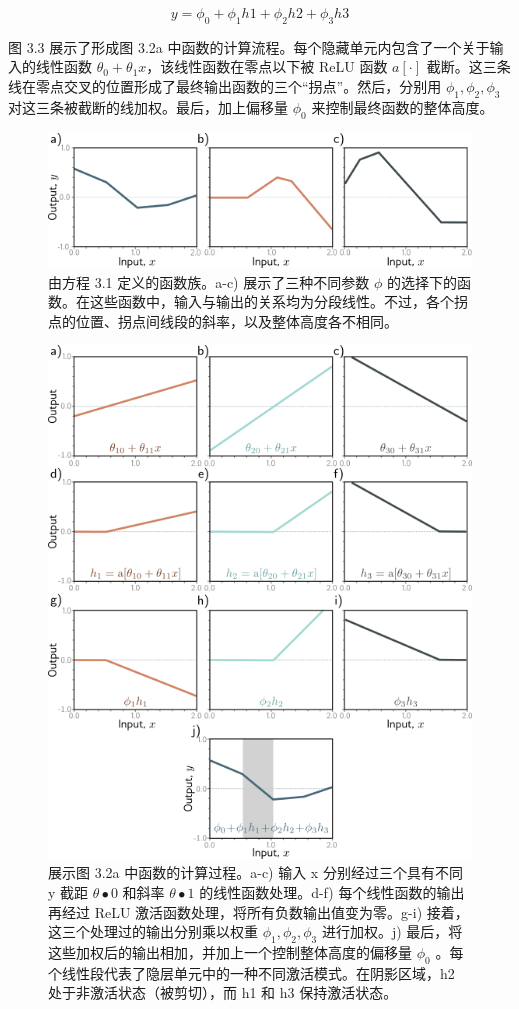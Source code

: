 \begin{equation}
y = \phi_0 + \phi_1h1 + \phi_2h2 + \phi_3h3 
\end{equation}

图 3.3 展示了形成图 3.2a 中函数的计算流程。每个隐藏单元内包含了一个关于输入的线性函数 \(\theta_0 + \theta_1x\)，该线性函数在零点以下被 ReLU 函数 \(a[\cdot]\) 截断。这三条线在零点交叉的位置形成了最终输出函数的三个“拐点”。然后，分别用 \(\phi_1, \phi_2, \phi_3\) 对这三条被截断的线加权。最后，加上偏移量 \(\phi_0\) 来控制最终函数的整体高度。

\begin{figure}[ht!]
	\centering
	\includegraphics[width=0.7\linewidth]{png/chapter3/ShallowFunctions.png}
\caption{由方程 3.1 定义的函数族。a-c) 展示了三种不同参数 \(\phi\) 的选择下的函数。在这些函数中，输入与输出的关系均为分段线性。不过，各个拐点的位置、拐点间线段的斜率，以及整体高度各不相同。}
\end{figure}

\begin{figure}[ht!]
	\centering
	\includegraphics[width=0.7\linewidth]{png/chapter3/ShallowBuildUp.png}
\caption{展示图 3.2a 中函数的计算过程。a-c) 输入 x 分别经过三个具有不同 y 截距 \(\theta•0\) 和斜率 \(\theta•1\) 的线性函数处理。d-f) 每个线性函数的输出再经过 ReLU 激活函数处理，将所有负数输出值变为零。g-i) 接着，这三个处理过的输出分别乘以权重 \(\phi_1 , \phi_2 , \phi_3\) 进行加权。j) 最后，将这些加权后的输出相加，并加上一个控制整体高度的偏移量 \(\phi_0\) 。每个线性段代表了隐层单元中的一种不同激活模式。在阴影区域，h2 处于非激活状态（被剪切），而 h1 和 h3 保持激活状态。}
\end{figure}

